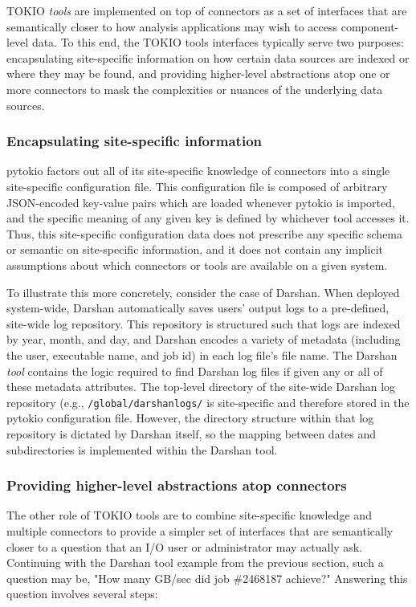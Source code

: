 TOKIO \emph{tools} are implemented on top of connectors as a set of interfaces that are semantically closer to how analysis applications may wish to access component-level data.
To this end, the TOKIO tools interfaces typically serve two purposes:
encapsulating site-specific information on how certain data sources are indexed or where they may be found, and
providing higher-level abstractions atop one or more connectors to mask the complexities or nuances of the underlying data sources.

\subsubsection{Encapsulating site-specific information}

pytokio factors out all of its site-specific knowledge of connectors into a single site-specific configuration file.
This configuration file is composed of arbitrary JSON-encoded key-value pairs which are loaded whenever pytokio is imported, and the specific meaning of any given key is defined by whichever tool accesses it.
Thus, this site-specific configuration data does not prescribe any specific schema or semantic on site-specific information, and it does not contain any implicit assumptions about which connectors or tools are available on a given system.

To illustrate this more concretely, consider the case of Darshan.
When deployed system-wide, Darshan automatically saves users' output logs to a pre-defined, site-wide log repository.
This repository is structured such that logs are indexed by year, month, and day, and Darshan encodes a variety of metadata (including the user, executable name, and job id) in each log file's file name.
The Darshan \emph{tool} contains the logic required to find Darshan log files if given any or all of these metadata attributes.
The top-level directory of the site-wide Darshan log repository (e.g., \texttt{{/global/darshanlogs/}} is site-specific and therefore stored in the pytokio configuration file.
However, the directory structure within that log repository is dictated by Darshan itself, so the mapping between dates and subdirectories is implemented within the Darshan tool.

\subsubsection{Providing higher-level abstractions atop connectors}

The other role of TOKIO tools are to combine site-specific knowledge and multiple connectors to provide a simpler set of interfaces that are semantically closer to a question that an I/O user or administrator may actually ask.
Continuing with the Darshan tool example from the previous section, such a question may be, "How many GB/sec did job \#2468187 achieve?"
Answering this question involves several steps:

